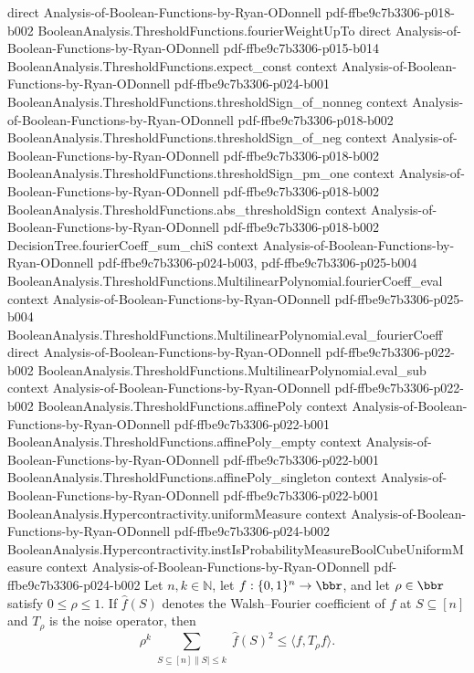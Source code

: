 \begin{lemma}
  {direct}
  {Analysis-of-Boolean-Functions-by-Ryan-ODonnell}
  {pdf-ffbe9c7b3306-p018-b002}
\proofstep
  {BooleanAnalysis.ThresholdFunctions.fourierWeightUpTo}
  {direct}
  {Analysis-of-Boolean-Functions-by-Ryan-ODonnell}
  {pdf-ffbe9c7b3306-p015-b014}
\proofstep
  {BooleanAnalysis.ThresholdFunctions.expect_const}
  {context}
  {Analysis-of-Boolean-Functions-by-Ryan-ODonnell}
  {pdf-ffbe9c7b3306-p024-b001}
\proofstep
  {BooleanAnalysis.ThresholdFunctions.thresholdSign_of_nonneg}
  {context}
  {Analysis-of-Boolean-Functions-by-Ryan-ODonnell}
  {pdf-ffbe9c7b3306-p018-b002}
\proofstep
  {BooleanAnalysis.ThresholdFunctions.thresholdSign_of_neg}
  {context}
  {Analysis-of-Boolean-Functions-by-Ryan-ODonnell}
  {pdf-ffbe9c7b3306-p018-b002}
\proofstep
  {BooleanAnalysis.ThresholdFunctions.thresholdSign_pm_one}
  {context}
  {Analysis-of-Boolean-Functions-by-Ryan-ODonnell}
  {pdf-ffbe9c7b3306-p018-b002}
\proofstep
  {BooleanAnalysis.ThresholdFunctions.abs_thresholdSign}
  {context}
  {Analysis-of-Boolean-Functions-by-Ryan-ODonnell}
  {pdf-ffbe9c7b3306-p018-b002}
\proofstep
  {DecisionTree.fourierCoeff_sum_chiS}
  {context}
  {Analysis-of-Boolean-Functions-by-Ryan-ODonnell}
  {pdf-ffbe9c7b3306-p024-b003,
    pdf-ffbe9c7b3306-p025-b004}
\proofstep
  {BooleanAnalysis.ThresholdFunctions.MultilinearPolynomial.fourierCoeff_eval}
  {context}
  {Analysis-of-Boolean-Functions-by-Ryan-ODonnell}
  {pdf-ffbe9c7b3306-p025-b004}
\proofstep
  {BooleanAnalysis.ThresholdFunctions.MultilinearPolynomial.eval_fourierCoeff}
  {direct}
  {Analysis-of-Boolean-Functions-by-Ryan-ODonnell}
  {pdf-ffbe9c7b3306-p022-b002}
\proofstep
  {BooleanAnalysis.ThresholdFunctions.MultilinearPolynomial.eval_sub}
  {context}
  {Analysis-of-Boolean-Functions-by-Ryan-ODonnell}
  {pdf-ffbe9c7b3306-p022-b002}
\proofstep
  {BooleanAnalysis.ThresholdFunctions.affinePoly}
  {context}
  {Analysis-of-Boolean-Functions-by-Ryan-ODonnell}
  {pdf-ffbe9c7b3306-p022-b001}
\proofstep
  {BooleanAnalysis.ThresholdFunctions.affinePoly_empty}
  {context}
  {Analysis-of-Boolean-Functions-by-Ryan-ODonnell}
  {pdf-ffbe9c7b3306-p022-b001}
\proofstep
  {BooleanAnalysis.ThresholdFunctions.affinePoly_singleton}
  {context}
  {Analysis-of-Boolean-Functions-by-Ryan-ODonnell}
  {pdf-ffbe9c7b3306-p022-b001}
\proofstep
  {BooleanAnalysis.Hypercontractivity.uniformMeasure}
  {context}
  {Analysis-of-Boolean-Functions-by-Ryan-ODonnell}
  {pdf-ffbe9c7b3306-p024-b002}
\proofstep
  {BooleanAnalysis.Hypercontractivity.instIsProbabilityMeasureBoolCubeUniformMeasure}
  {context}
  {Analysis-of-Boolean-Functions-by-Ryan-ODonnell}
  {pdf-ffbe9c7b3306-p024-b002}
Let $n,k\in\mathbb N$, let $f:\{0,1\}^n\to\bbr$, and let $\rho\in\bbr$ satisfy
$0\le\rho\le1$. If $\widehat f(S)$ denotes the Walsh–Fourier coefficient of $f$ at
$S\subseteq[n]$ and $T_\rho$ is the noise operator, then
\[\rho^k\sum_{\substack{S\subseteq[n]\|S|\le k}}\widehat f(S)^2\le\langle f,T_\rho
f\rangle.\]
\end{lemma}

